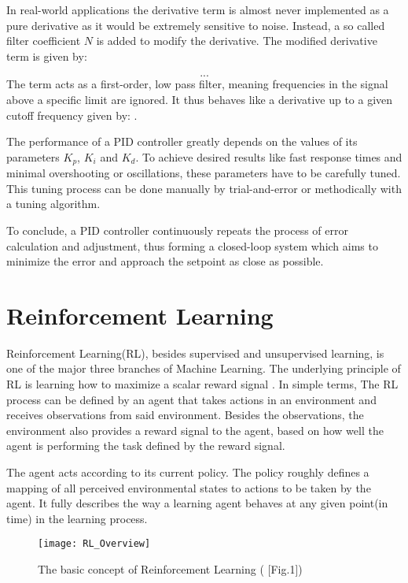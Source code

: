 In real-world applications the derivative term is almost never implemented as a pure derivative as it would be extremely sensitive to noise.
Instead, a so called filter coefficient $N$ is added to modify the derivative.
The modified derivative term is given by:

\[
...
\]
The term acts as a first-order, low pass filter, meaning frequencies in the signal above a specific limit are ignored.
It thus behaves like a derivative up to a given cutoff frequency given by: .

The performance of a PID controller greatly depends on the values of its parameters $K_p$, $K_i$ and $K_d$.
To achieve desired results like fast response times and minimal overshooting or oscillations, these parameters have to be carefully tuned. 
This tuning process can be done manually by trial-and-error or methodically with a tuning algorithm.

To conclude, a PID controller continuously repeats the process of error calculation and adjustment, thus forming a closed-loop system which aims to minimize the error and approach the setpoint as close as possible.



\section{Reinforcement Learning}


Reinforcement Learning(RL), besides supervised and unsupervised learning, is one of the major three branches of Machine Learning.
The underlying principle of RL is learning how to maximize a scalar reward signal \parencite{sutton2018reinforcement}.
In simple terms, The RL process can be defined by an agent that takes actions in an environment and receives observations from said environment.
Besides the observations, the environment also provides a reward signal to the agent, based on how well the agent is performing the task defined by the reward signal. 


The agent acts according to its current policy.
The policy roughly defines a mapping of all perceived environmental states to actions to be taken by the agent.
It fully  describes the way a learning agent behaves at any given point(in time) in the learning process.\parencite{sutton2018reinforcement} \parencite{D. Silver Lec. 2}

\begin{figure}[h]
	\centerline{\texttt{[image: RL\_Overview]}}
	\caption{The basic concept of Reinforcement Learning (\cite{weng2018bandit} [Fig.1])}
	\label{figure: RL Illustration}
\end{figure}


